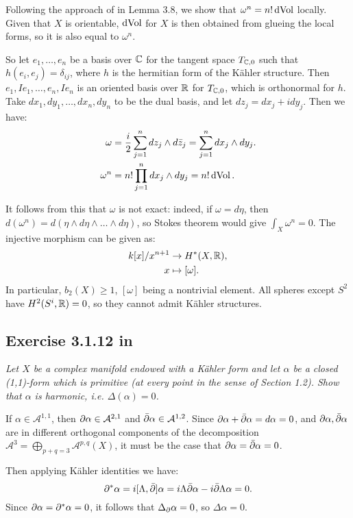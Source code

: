 \documentclass{article}
\begin{document}
Following the approach of \cite{Voi1} in Lemma 3.8, we show that $\omega^n = n! \operatorname{dVol}$ locally. Given that $X$
is orientable, $\operatorname{dVol}$ for $X$ is then obtained from glueing the local forms, so it is also equal to $\omega^n$.

So let $e_1, \dots, e_n$ be a basis over $\mathbb{C}$ for the tangent space $T_{\mathbb{C},0}$ such that $h(e_i, e_j) = \delta_{ij}$,
where $h$ is the hermitian form of the K\"{a}hler structure. Then $e_1, Ie_1, \dots, e_n, Ie_n$ is an oriented
basis over $\mathbb{R}$ for $T_{\mathbb{C},0}$, which is orthonormal for $h$. Take $dx_1, dy_1, \dots, dx_n, dy_n$ to be the dual basis,
and let $dz_j = dx_j + idy_j$. Then we have:
\begin{align*}
\omega &= \frac{i}{2} \sum_{j=1}^n dz_j \wedge d\bar z_j = \sum_{j=1}^n dx_j \wedge dy_j. \\
\omega^n &= n! \prod_{j=1}^n dx_j \wedge dy_j = n! \operatorname{dVol}.
\end{align*}


It follows from this that $\omega$ is not exact: indeed, if $\omega = d\eta$, then $d(\omega^n) = d(\eta
\wedge d\eta \wedge \dots \wedge d\eta)$, so Stokes theorem would give $\int_X \omega^n = 0$. The injective
morphism can be given as:
\begin{align*}
k[x]/x^{n+1} &\to H^*(X,\mathbb{R}) ,\\
x &\mapsto [\omega].
\end{align*}
In particular, $b_2(X) \geq 1$, $[\omega]$ being a nontrivial element. All spheres except $S^2$ have $H^2(S^i, \mathbb{R}) = 0$,
so they cannot admit K\"{a}hler structures.


\subsection*{Exercise 3.1.12 in \cite{Huy}}
\emph{Let $X$ be a complex manifold endowed with a K\"{a}hler form and let $\alpha$ be
a closed (1,1)-form which is primitive (at every point in the sense of Section 1.2).
Show that $\alpha$ is harmonic, i.e. $\Delta(\alpha) = 0$.}
\vspace{3mm}

If $\alpha \in \mathcal{A}^{1,1}$, then $\partial \alpha \in \mathcal{A}^{2,1}$ and $\bar {\partial} \alpha \in \mathcal{A}^{1,2}$.
Since $\partial \alpha + \bar {\partial} \alpha = d\alpha = 0$, and $\partial \alpha, \bar {\partial} \alpha$ are in different orthogonal components
of the decomposition $\mathcal{A}^3 = \bigoplus_{p+q = 3} \mathcal{A}^{p,q}(X)$, it must be the case that
$\partial \alpha = \bar {\partial} \alpha = 0$.

Then applying K\"{a}hler identities we have:
\[  \partial^*\alpha = i[\Lambda,\bar {\partial}] \alpha = i\Lambda \bar {\partial} \alpha - i\bar {\partial} \Lambda \alpha = 0.	\]
Since $\partial \alpha = \partial^*\alpha = 0$, it follows that $\Delta_{\partial} \alpha = 0$, so $\Delta \alpha = 0$.
\end{document}
